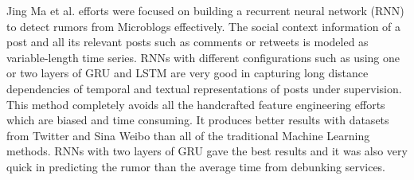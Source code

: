 \documentclass[a4paper, 11pt]{article}
\begin{document}




Jing Ma et al. efforts were focused on building a recurrent neural network (RNN) to detect rumors from Microblogs effectively. The social context information of a post and all its relevant posts such as comments or retweets is modeled as variable-length time series.  RNNs with different configurations such as using one or two layers of GRU and LSTM are very good in capturing long distance dependencies of temporal and textual representations of posts under supervision. This method completely avoids all the handcrafted feature engineering efforts which are biased and time consuming. It produces better results with datasets from Twitter and Sina Weibo than all of the traditional Machine Learning methods. RNNs with two layers of GRU gave the best results and it was also very quick in predicting the rumor than the average time from debunking services.  




\end{document}
